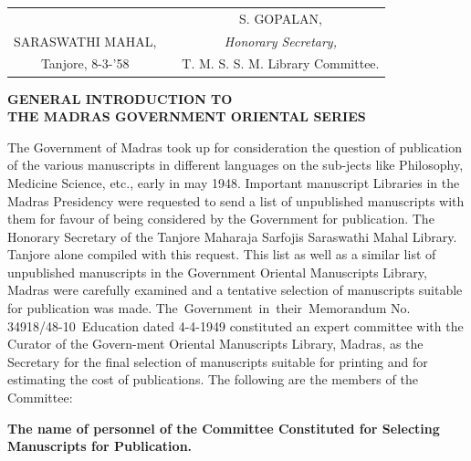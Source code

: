 \documentclass[11pt, openany]{book}
\begin{document}
\vspace{1cm}
\begin{table}[h!]
\englishfont\renewcommand{\arraystretch}{1.1}
\begin{tabular}{ccc}
&&\hspace{0.7cm}\large S. GOPALAN,\\
\small SARASWATHI  MAHAL,&\hspace{-2mm}\multirow{2}{*}{$\bigg\}$}&\hspace{0.7cm}\textit{Honorary Secretary,} \\
\small Tanjore, 8-3-'58&&\hspace{0.7cm} T. M. S. S. M. Library Committee.\\
   
\end{tabular}
\end{table}

\newpage
\thispagestyle{empty}
{\englishfont
\begin{center}
 \textbf{\large GENERAL INTRODUCTION TO\\}
\textbf{\large THE MADRAS GOVERNMENT ORIENTAL SERIES\\}
\end{center}

The Government of Madras took up for consideration the question of publication of the various manuscripts in different
languages on the sub-jects like Philosophy, Medicine Science, etc.,
early in may 1948. Important manuscript Libraries in the
Madras Presidency were requested to send a list of unpublished
manuscripts with them for favour of being considered by the 
Government for publication. The Honorary Secretary of the
Tanjore Maharaja Sarfojis Saraswathi Mahal Library. Tanjore alone compiled with this request. This list as well as a similar
list of unpublished manuscripts in the Government Oriental
Manuscripts Library, Madras were carefully examined and a
tentative selection of manuscripts suitable for publication was
made. The \,Government \,in \,their \,Memorandum No. 34918/48-10 \,Education dated 4-4-1949 constituted an expert committee with
the Curator of the Govern-ment Oriental Manuscripts Library,
Madras, as the Secretary for the final selection of manuscripts
suitable for printing and for estimating the cost of publications.
The following are the members of the Committee:\textendash}
\begin{center}
{\englishfont \textbf{The name of personnel of the Committee Constituted for
 Selecting Manuscripts for Publication.}}
\end{center}
\vspace{-3mm}
\end{document}
